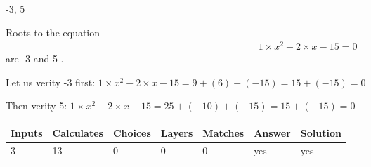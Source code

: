 \documentclass[12pt]{article}
\begin{document}
-3,  %
5
 
 
 
\noindent{}
 
 

 
 
 
\noindent{}
 
 

Roots to the equation
\begin{eqnarray*}
1 \times x^2  %
-2
                 \times x    %
-15 =0
\end{eqnarray*}
are  %
-3 and  %
5 .
 
Let us verity  %
-3 first:
$  %
1 \times x^2  %
-2
                 \times x    %
-15
  = %
9+( %
6)+( %
-15)
  = %
15+( %
-15)
  = %
0
$
 
Then verity  %
5:
$  %
1 \times x^2  %
-2
                 \times x    %
-15
  = %
25+( %
-10)+( %
-15)
  = %
15+( %
-15)
  = %
0
$
 
 
 
\noindent{}
 
 

 
\vspace{0.3in}
   
   
   
   
\noindent\begin{tabular}{|l|l|l|l|l|l|l|}
 \hline
Inputs & Calculates & Choices & Layers & Matches & Answer & Solution \\ \hline
           3 & 
          13 & 
           0
  & 
           0 & 
           0 & 
  yes & 
  yes 
  \\ \hline
 \end{tabular}
   
   
   
   
\noindent{}
   
   
  
\end{document}

